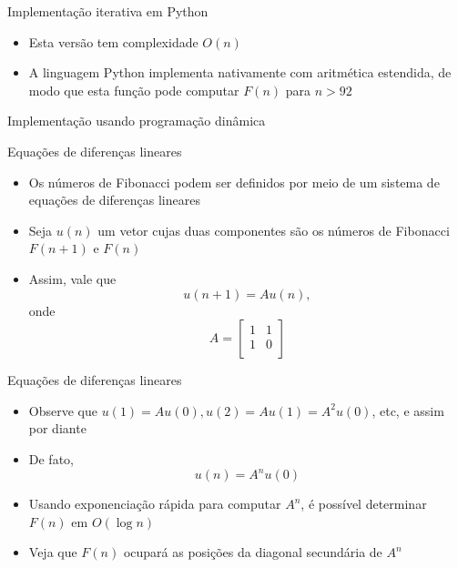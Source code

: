 \begin{frame}[fragile]{Implementação iterativa em Python}

    \begin{itemize}

        \item Esta versão tem complexidade $O(n)$ 

        \item A linguagem Python implementa nativamente com aritmética estendida, de modo que esta
            função pode computar $F(n)$ para $n > 92$
    \end{itemize}

\end{frame}

\begin{frame}[fragile]{Implementação usando programação dinâmica}
\end{frame}

\begin{frame}[fragile]{Equações de diferenças lineares}

    \begin{itemize}
        \item Os números de Fibonacci podem ser definidos por meio de um sistema de equações de
            diferenças lineares

        \item Seja $u(n)$ um vetor cujas duas componentes são os números de Fibonacci $F(n + 1)$ e 
            $F(n)$

        \item Assim, vale que
$$
        u(n + 1) = Au(n),
$$
onde
$$
A = \begin{bmatrix}
    1 & 1 \\
    1 & 0 \\
\end{bmatrix}
$$
    \end{itemize}

\end{frame}

\begin{frame}[fragile]{Equações de diferenças lineares}

    \begin{itemize}
        \item Observe que $u(1) = Au(0), u(2) = Au(1) = A^2u(0)$, etc, e assim por diante

        \item De fato,
$$
        u(n) = A^nu(0)
$$

        \item Usando exponenciação rápida para computar $A^n$, é possível determinar $F(n)$ em
            $O(\log n)$ 

        \item Veja que $F(n)$ ocupará as posições da diagonal secundária de $A^n$
    \end{itemize}

\end{frame}

